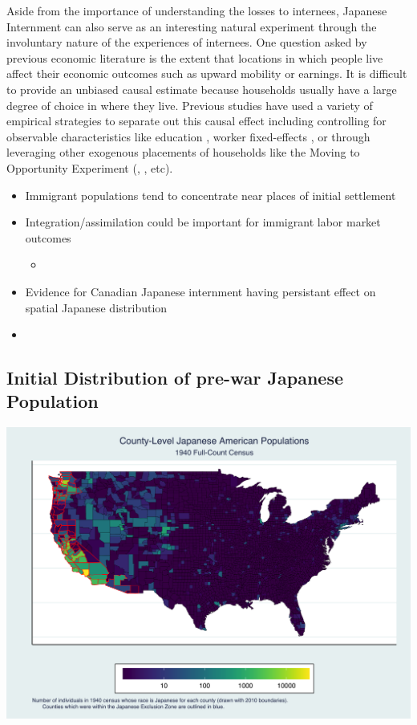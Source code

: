 \documentclass[12pt]{article}
\begin{document}
Aside from the importance of understanding the losses to internees, Japanese
Internment can also serve as an interesting natural experiment through the
involuntary nature of the experiences of internees. One question asked by
previous economic literature is the extent that locations in which people live
affect their economic outcomes such as upward mobility or earnings. It is
difficult to provide an unbiased causal estimate because households usually
have a large degree of choice in where they live. Previous studies have used a
variety of empirical strategies to separate out this causal effect including
controlling for observable characteristics like education
\cite{glaeser_cities_2001}, worker fixed-effects \citep{card_location_2021}, or
through leveraging other exogenous placements of households like the Moving to
Opportunity Experiment (\cite{ludwig_long-term_2013},
\cite{chetty_effects_2016}, etc). 

\begin{itemize}
\item
  Immigrant populations tend to concentrate near places of initial
  settlement
\item
  Integration/assimilation could be important for immigrant labor market
  outcomes

  \begin{itemize}
  
  \item
    \cite{damm_ethnic_2009}
  \end{itemize}
\item
  Evidence for Canadian Japanese internment having persistant effect on
  spatial Japanese distribution
\item
  \cite{chan_forced_2022}
\end{itemize}

\subsection{Initial Distribution of pre-war Japanese
Population}\label{initial-distribution-of-pre-war-japanese-population}

\begin{center}
\includegraphics[width=1.0\textwidth]{figures/county_JAmap.png}
\end{center}
\end{document}
